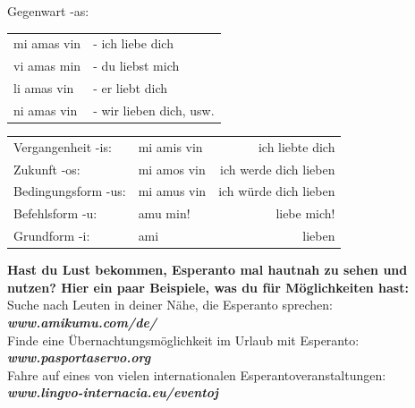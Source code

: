 \documentclass{leaflet}
\begin{document}
Gegenwart -as:

\begin{tabular}{ll}
mi amas vin &- ich liebe dich\\
vi amas min &- du liebst mich\\
li amas vin &- er liebt dich\\
ni amas vin &- wir lieben dich, usw.
\end{tabular}



\begingroup
\setlength{\tabcolsep}{2.5pt} %
\renewcommand{\arraystretch}{0.9} %
\begin{tabular}{llr}
Vergangenheit -is: & mi amis vin & ich liebte dich \\
Zukunft -os: & mi amos vin & ich werde dich lieben \\
Bedingungsform -us: & mi amus vin & ich würde dich lieben \\
Befehlsform -u: & amu min! & liebe mich! \\
Grundform -i: & ami & lieben\\
\end{tabular}
\endgroup

\begin{framed}
	\textbf{Hast du Lust bekommen, Esperanto mal hautnah zu sehen und nutzen? 
	Hier ein paar Beispiele, was du für Möglichkeiten hast:} \\
		Suche nach Leuten in deiner Nähe, die Esperanto sprechen: \hfill \textit{\textbf{{\small www.amikumu.com/de/}}}\\
		Finde eine Übernachtungsmöglichkeit im Urlaub mit Esperanto: \hfill \textit{\textbf{{\small www.pasportaservo.org}}}\\
		Fahre auf eines von vielen internationalen Esperantoveranstaltungen: \hfill \textit{\textbf{{\small www.lingvo-internacia.eu/eventoj}}}\\

\end{framed}
\end{document}

